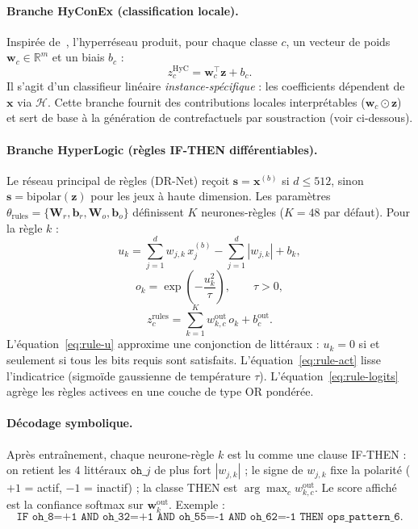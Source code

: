 \documentclass[12pt,a4paper]{article}
\begin{document}
\paragraph{Branche HyConEx (classification locale).}
Inspir\'ee de~\cite{hyconex2026}, l'hyperr\'eseau produit, pour chaque classe $c$, un vecteur de poids $\bm{w}_c\in\mathbb{R}^{m}$ et un biais $b_c$ :
\[
z_c^{\mathrm{HyC}}=\bm{w}_c^\top\bm{z}+b_c.
\]
Il s'agit d'un classifieur lin\'eaire \emph{instance-sp\'ecifique} : les coefficients d\'ependent de $\bm{x}$ via $\mathcal{H}$. Cette branche fournit des contributions locales interpr\'etables ($\bm{w}_c\odot\bm{z}$) et sert de base \`a la g\'en\'eration de contrefactuels par soustraction (voir ci-dessous).

\paragraph{Branche HyperLogic (r\`egles IF-THEN diff\'erentiables).}
Le r\'eseau principal de r\`egles (DR-Net) re\c{c}oit $\bm{s}=\bm{x}^{(b)}$ si $d\leq512$, sinon $\bm{s}=\mathrm{bipolar}(\bm{z})$ pour les jeux \`a haute dimension.
Les param\`etres $\theta_{\mathrm{rules}}=\{\bm{W}_r,\bm{b}_r,\bm{W}_o,\bm{b}_o\}$ d\'efinissent $K$ neurones-r\`egles ($K=48$ par d\'efaut). Pour la r\`egle $k$ :
\begin{equation}
u_k=\sum_{j=1}^{d} w_{j,k}\,x^{(b)}_j-\sum_{j=1}^{d}|w_{j,k}|+b_k,
\label{eq:rule-u}
\end{equation}
\begin{equation}
o_k=\exp\!\left(-\frac{u_k^2}{\tau}\right),\qquad \tau>0,
\label{eq:rule-act}
\end{equation}
\begin{equation}
z_c^{\mathrm{rules}}=\sum_{k=1}^{K} w_{k,c}^{\mathrm{out}}\,o_k+b_c^{\mathrm{out}}.
\label{eq:rule-logits}
\end{equation}
L'\'equation~\eqref{eq:rule-u} approxime une conjonction de litt\'eraux : $u_k=0$ si et seulement si tous les bits requis sont satisfaits. L'\'equation~\eqref{eq:rule-act} lisse l'indicatrice (sigmo\"ide gaussienne de temp\'erature $\tau$). L'\'equation~\eqref{eq:rule-logits} agr\`ege les r\`egles activees en une couche de type OR pond\'er\'ee.

\paragraph{D\'ecodage symbolique.}
Apr\`es entra\^inement, chaque neurone-r\`egle $k$ est lu comme une clause IF-THEN : on retient les $4$ litt\'eraux $\texttt{oh\_$j$}$ de plus fort $|w_{j,k}|$ ; le signe de $w_{j,k}$ fixe la polarit\'e ($+1$ = actif, $-1$ = inactif) ; la classe THEN est $\arg\max_c w_{k,c}^{\mathrm{out}}$. Le score affich\'e est la confiance softmax sur $\bm{w}_k^{\mathrm{out}}$. Exemple :
\[
\texttt{IF oh\_8=+1 AND oh\_32=+1 AND oh\_55=-1 AND oh\_62=-1 THEN ops\_pattern\_6}.
\]
\end{document}

